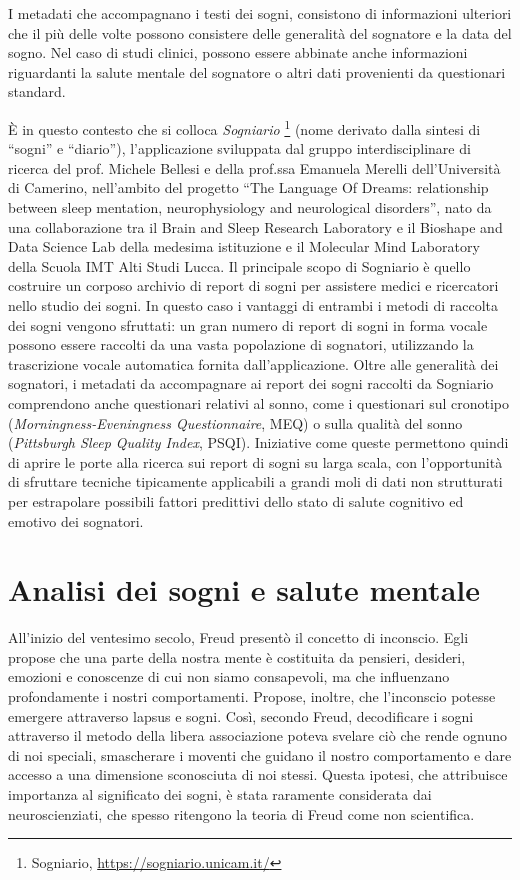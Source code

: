 I metadati che accompagnano i testi dei sogni, consistono di informazioni ulteriori che il più delle volte possono
consistere delle generalità del sognatore e la data del sogno.
Nel caso di studi clinici, possono essere abbinate anche informazioni riguardanti la salute mentale del sognatore o
altri dati provenienti da questionari standard. \newline

\`E in questo contesto che si colloca \textit{Sogniario} \footnote{Sogniario, \url{https://sogniario.unicam.it/}}
(nome derivato dalla sintesi di ``sogni'' e ``diario''), l'applicazione sviluppata dal gruppo interdisciplinare di ricerca
del prof. Michele Bellesi e della prof.ssa Emanuela Merelli dell'Università di Camerino, nell'ambito del progetto
``The Language Of Dreams: relationship between sleep mentation, neurophysiology and neurological disorders'', nato da una
collaborazione tra il Brain and Sleep Research Laboratory e il Bioshape and Data Science Lab della medesima istituzione
e il Molecular Mind Laboratory della Scuola IMT Alti Studi Lucca.
Il principale scopo di Sogniario è quello costruire un corposo archivio di report di sogni per assistere medici e
ricercatori nello studio dei sogni.
In questo caso i vantaggi di entrambi i metodi di raccolta dei sogni vengono sfruttati:
un gran numero di report di sogni in forma vocale possono essere raccolti da una vasta popolazione di sognatori,
utilizzando la trascrizione vocale automatica fornita dall'applicazione.
Oltre alle generalità dei sognatori, i metadati da accompagnare ai report dei sogni raccolti da Sogniario
comprendono anche questionari relativi al sonno, come i questionari sul cronotipo
(\textit{Morningness-Eveningness Questionnaire}, MEQ) o sulla qualità del sonno
(\textit{Pittsburgh Sleep Quality Index}, PSQI).
Iniziative come queste permettono quindi di aprire le porte alla ricerca sui report di sogni su larga scala, con
l'opportunità di sfruttare tecniche tipicamente applicabili a grandi moli di dati non strutturati per
estrapolare possibili fattori predittivi dello stato di salute cognitivo ed emotivo dei sognatori.

\section{Analisi dei sogni e salute mentale}

All'inizio del ventesimo secolo, Freud presentò il concetto di inconscio.
Egli propose che una parte della nostra mente è costituita da pensieri, desideri, emozioni e conoscenze di cui non
siamo consapevoli, ma che influenzano profondamente i nostri comportamenti.
Propose, inoltre, che l'inconscio potesse emergere attraverso lapsus e sogni.
Così, secondo Freud, decodificare i sogni attraverso il metodo della libera associazione poteva
svelare ciò che rende ognuno di noi speciali, smascherare i moventi che guidano il nostro comportamento e
dare accesso a una dimensione sconosciuta di noi stessi.
Questa ipotesi, che attribuisce importanza al significato dei sogni, è stata raramente considerata
dai neuroscienziati, che spesso ritengono la teoria di Freud come non scientifica.

